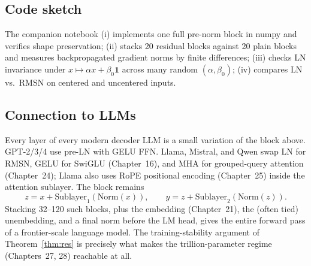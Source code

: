 \subsection*{Code sketch}

The companion notebook (i) implements one full pre-norm block in numpy and verifies shape preservation; (ii) stacks 20 residual blocks against 20 plain blocks and measures backpropagated gradient norms by finite differences; (iii) checks LN invariance under $x \mapsto \alpha x + \beta_0 \mathbf{1}$ across many random $(\alpha, \beta_0)$; (iv) compares LN vs.\ RMSN on centered and uncentered inputs.

\subsection*{Connection to LLMs}

Every layer of every modern decoder LLM is a small variation of the block above. GPT-2/3/4 use pre-LN with GELU FFN. Llama, Mistral, and Qwen swap LN for RMSN, GELU for SwiGLU (Chapter~16), and MHA for grouped-query attention (Chapter~24); Llama also uses RoPE positional encoding (Chapter~25) inside the attention sublayer. The block remains
\[
  z = x + \mathrm{Sublayer}_1(\mathrm{Norm}(x)),
  \qquad
  y = z + \mathrm{Sublayer}_2(\mathrm{Norm}(z)).
\]
Stacking 32--120 such blocks, plus the embedding (Chapter~21), the (often tied) unembedding, and a final norm before the LM head, gives the entire forward pass of a frontier-scale language model. The training-stability argument of Theorem~\ref{thm:res} is precisely what makes the trillion-parameter regime (Chapters~27, 28) reachable at all.
